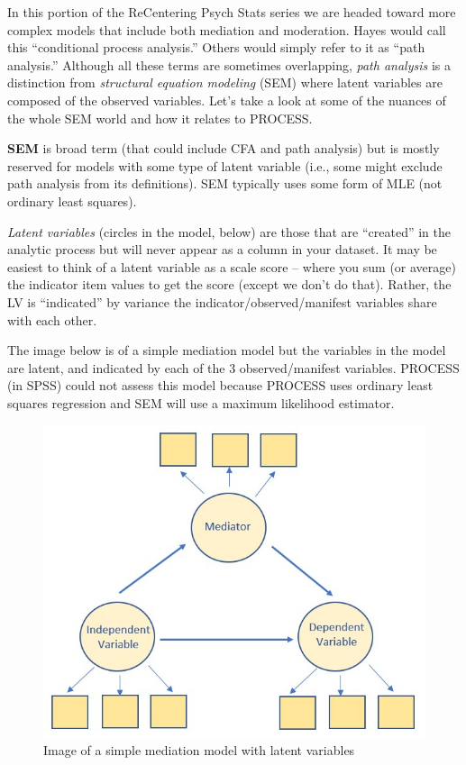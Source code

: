 \documentclass[
  11pt,
]{book}
\begin{document}
In this portion of the ReCentering Psych Stats series we are headed toward more complex models that include both mediation and moderation. Hayes \citep{hayes_introduction_2018} would call this ``conditional process analysis.'' Others would simply refer to it as ``path analysis.'' Although all these terms are sometimes overlapping, \emph{path analysis} is a distinction from \emph{structural equation modeling} (SEM) where latent variables are composed of the observed variables. Let's take a look at some of the nuances of the whole SEM world and how it relates to PROCESS.

\textbf{SEM} is broad term (that could include CFA and path analysis) but is mostly reserved for models with some type of latent variable (i.e., some might exclude path analysis from its definitions). SEM typically uses some form of MLE (not ordinary least squares).

\emph{Latent variables} (circles in the model, below) are those that are ``created'' in the analytic process but will never appear as a column in your dataset. It may be easiest to think of a latent variable as a scale score -- where you sum (or average) the indicator item values to get the score (except we don't do that). Rather, the LV is ``indicated'' by variance the indicator/observed/manifest variables share with each other.

The image below is of a simple mediation model but the variables in the model are latent, and indicated by each of the 3 observed/manifest variables. PROCESS (in SPSS) could not assess this model because PROCESS uses ordinary least squares regression and SEM will use a maximum likelihood estimator.

\begin{figure}
\centering
\includegraphics{images/SimpleMod/SimpleMedLV.jpg}
\caption{Image of a simple mediation model with latent variables}
\end{figure}
\end{document}
